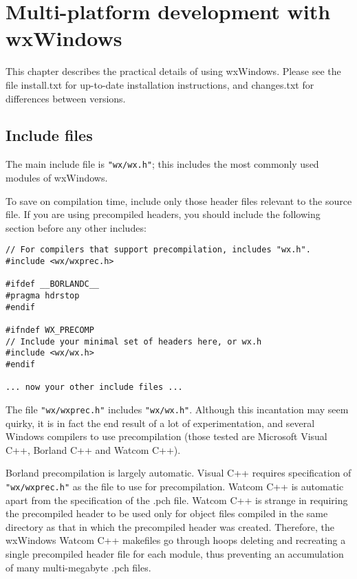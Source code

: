 \chapter{Multi-platform development with wxWindows}\label{multiplat}
%
\setfooter{\thepage}{}{}{}{}{\thepage}%

This chapter describes the practical details of using wxWindows. Please
see the file install.txt for up-to-date installation instructions, and
changes.txt for differences between versions.

\section{Include files}

The main include file is {\tt "wx/wx.h"}; this includes the most commonly
used modules of wxWindows.

To save on compilation time, include only those header files relevant to the
source file. If you are using precompiled headers, you should include
the following section before any other includes:

\begin{verbatim}
// For compilers that support precompilation, includes "wx.h".
#include <wx/wxprec.h>

#ifdef __BORLANDC__
#pragma hdrstop
#endif

#ifndef WX_PRECOMP
// Include your minimal set of headers here, or wx.h
#include <wx/wx.h>
#endif

... now your other include files ...
\end{verbatim}

The file {\tt "wx/wxprec.h"} includes {\tt "wx/wx.h"}. Although this incantation
may seem quirky, it is in fact the end result of a lot of experimentation,
and several Windows compilers to use precompilation (those tested are Microsoft Visual C++, Borland C++
and Watcom C++).

Borland precompilation is largely automatic. Visual C++ requires specification of {\tt "wx/wxprec.h"} as
the file to use for precompilation. Watcom C++ is automatic apart from the specification of
the .pch file. Watcom C++ is strange in requiring the precompiled header to be used only for
object files compiled in the same directory as that in which the precompiled header was created.
Therefore, the wxWindows Watcom C++ makefiles go through hoops deleting and recreating
a single precompiled header file for each module, thus preventing an accumulation of many
multi-megabyte .pch files.


